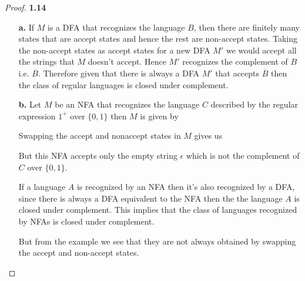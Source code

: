\documentclass[11pt]{article}
\theoremstyle{definition}
\begin{document}
\begin{proof}{\textbf{1.14}}
\begin{itemize}
    \item [\textbf{a.}] If $M$ is a DFA that recognizes the language $B$, then
    there are finitely many states that are accept states and hence the rest
    are non-accept states. Taking the non-accept states as accept states for 
    a new DFA $M'$ we would accept all the strings that $M$ doesn't
    accept. Hence $M'$ recognizes the complement of $B$ i.e. $\overline{B}$.
    Therefore given that there is always a DFA $M'$ that accepts
    $\overline{B}$ then the class of regular languages is closed under
    complement.
    \item [\textbf{b.}] Let $M$ be an NFA that recognizes the language
    $C$ described by the regular expression $1^+$ over $\{0,1\}$ then $M$
    is given by
    \begin{figure}[H]
        \centering
    \end{figure}
    Swapping the accept and nonaccept states in $M$ gives us 
    \begin{figure}[H]
        \centering
    \end{figure}
    But this NFA accepts only the empty string $\epsilon$ which is not the
    complement of $C$ over $\{0,1\}$.

    If a language $A$ is recognized by an NFA then it's also recognized
    by a DFA, since there is always a DFA equivalent to the NFA then the 
    the language $A$ is closed under complement. This implies that the class
    of languages recognized by NFAs is closed under complement.

    But from the example we see that they are not always obtained by swapping
    the accept and non-accept states.
    \end{itemize}    
\end{proof}
\end{document}
